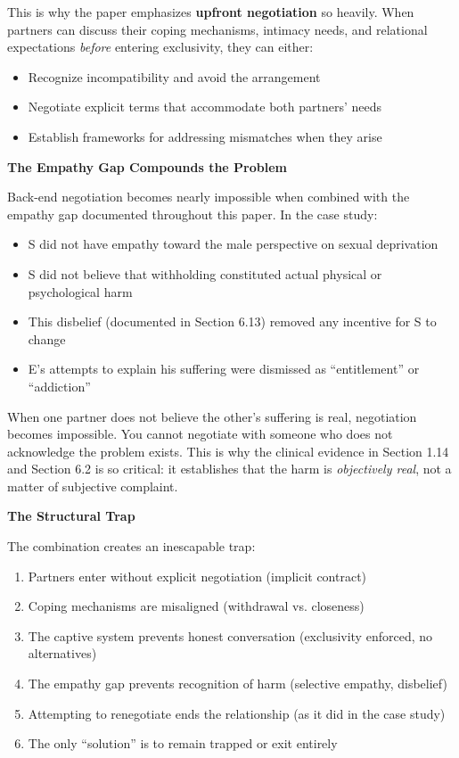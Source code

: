 \documentclass[12pt, letterpaper]{article}
\begin{document}
This is why the paper emphasizes \textbf{upfront negotiation} so heavily. When partners can discuss their coping mechanisms, intimacy needs, and relational expectations \textit{before} entering exclusivity, they can either:
\begin{itemize}
    \item Recognize incompatibility and avoid the arrangement
    \item Negotiate explicit terms that accommodate both partners' needs
    \item Establish frameworks for addressing mismatches when they arise
\end{itemize}

\textbf{The Empathy Gap Compounds the Problem}

Back-end negotiation becomes nearly impossible when combined with the empathy gap documented throughout this paper. In the case study:

\begin{itemize}
    \item S did not have empathy toward the male perspective on sexual deprivation
    \item S did not believe that withholding constituted actual physical or psychological harm
    \item This disbelief (documented in Section 6.13) removed any incentive for S to change
    \item E's attempts to explain his suffering were dismissed as ``entitlement'' or ``addiction''
\end{itemize}

When one partner does not believe the other's suffering is real, negotiation becomes impossible. You cannot negotiate with someone who does not acknowledge the problem exists. This is why the clinical evidence in Section 1.14 and Section 6.2 is so critical: it establishes that the harm is \textit{objectively real}, not a matter of subjective complaint.

\textbf{The Structural Trap}

The combination creates an inescapable trap:
\begin{enumerate}
    \item Partners enter without explicit negotiation (implicit contract)
    \item Coping mechanisms are misaligned (withdrawal vs. closeness)
    \item The captive system prevents honest conversation (exclusivity enforced, no alternatives)
    \item The empathy gap prevents recognition of harm (selective empathy, disbelief)
    \item Attempting to renegotiate ends the relationship (as it did in the case study)
    \item The only ``solution'' is to remain trapped or exit entirely
\end{enumerate}
\end{document}
